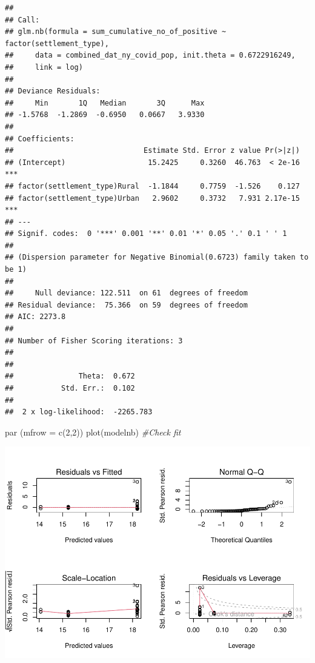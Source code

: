\documentclass[
  12pt,
]{article}
\newenvironment{Shaded}{\begin{snugshade}}{\end{snugshade}}
\newcommand{\AttributeTok}[1]{\textcolor[rgb]{0.77,0.63,0.00}{#1}}
\newcommand{\CommentTok}[1]{\textcolor[rgb]{0.56,0.35,0.01}{\textit{#1}}}
\newcommand{\DecValTok}[1]{\textcolor[rgb]{0.00,0.00,0.81}{#1}}
\newcommand{\FunctionTok}[1]{\textcolor[rgb]{0.00,0.00,0.00}{#1}}
\newcommand{\NormalTok}[1]{#1}
\begin{document}
\begin{verbatim}
## 
## Call:
## glm.nb(formula = sum_cumulative_no_of_positive ~ factor(settlement_type), 
##     data = combined_dat_ny_covid_pop, init.theta = 0.6722916249, 
##     link = log)
## 
## Deviance Residuals: 
##     Min       1Q   Median       3Q      Max  
## -1.5768  -1.2869  -0.6950   0.0667   3.9330  
## 
## Coefficients:
##                              Estimate Std. Error z value Pr(>|z|)    
## (Intercept)                   15.2425     0.3260  46.763  < 2e-16 ***
## factor(settlement_type)Rural  -1.1844     0.7759  -1.526    0.127    
## factor(settlement_type)Urban   2.9602     0.3732   7.931 2.17e-15 ***
## ---
## Signif. codes:  0 '***' 0.001 '**' 0.01 '*' 0.05 '.' 0.1 ' ' 1
## 
## (Dispersion parameter for Negative Binomial(0.6723) family taken to be 1)
## 
##     Null deviance: 122.511  on 61  degrees of freedom
## Residual deviance:  75.366  on 59  degrees of freedom
## AIC: 2273.8
## 
## Number of Fisher Scoring iterations: 3
## 
## 
##               Theta:  0.672 
##           Std. Err.:  0.102 
## 
##  2 x log-likelihood:  -2265.783
\end{verbatim}

\begin{Shaded}
\begin{Highlighting}[]
\FunctionTok{par}\NormalTok{ (}\AttributeTok{mfrow =} \FunctionTok{c}\NormalTok{(}\DecValTok{2}\NormalTok{,}\DecValTok{2}\NormalTok{))}
\FunctionTok{plot}\NormalTok{(modelnb) }\CommentTok{\#Check fit}
\end{Highlighting}
\end{Shaded}

\includegraphics{EDA_Final_Group_Project_files/figure-latex/unnamed-chunk-24-1.pdf}
\end{document}

